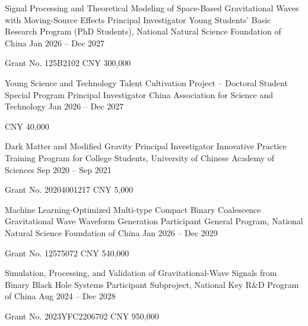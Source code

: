\begin{cventries}

  \fundingentry
    {Signal Processing and Theoretical Modeling of Space-Based Gravitational Waves with Moving-Source Effects}
    {Principal Investigator}
    {Young Students’ Basic Research Program (PhD Students), National Natural Science Foundation of China}
    {Jan 2026 -- Dec 2027}
    {
      \begin{cvitems} %
        \item{Grant No. 125B2102 \textperiodcentered{} CNY 300,000}
      \end{cvitems}
    }

  \vspace{0.1em}
  \fundingentry
    {Young Science and Technology Talent Cultivation Project -- Doctoral Student Special Program}
    {Principal Investigator}
    {China Association for Science and Technology}
    {Jan 2026 -- Dec 2027}
    {
      \begin{cvitems}
        \item{CNY 40,000}
      \end{cvitems}
    }

  \vspace{0.1em}
  \fundingentry
    {Dark Matter and Modified Gravity}
    {Principal Investigator}
    {Innovative Practice Training Program for College Students, University of Chinese Academy of Sciences}
    {Sep 2020 -- Sep 2021}
    {
      \begin{cvitems}
        \item{Grant No. 20204001217 \textperiodcentered{} CNY 5,000}
      \end{cvitems}
    }

  \fundingentry
    {Machine Learning-Optimized Multi-type Compact Binary Coalescence Gravitational Wave Waveform Generation}
    {Participant}
    {General Program, National Natural Science Foundation of China}
    {Jan 2026 -- Dec 2029}
    {
      \begin{cvitems}
        \item{Grant No. 12575072 \textperiodcentered{} CNY 540,000}
      \end{cvitems}
    }

  \vspace{0.1em}
  \fundingentry
    {Simulation, Processing, and Validation of Gravitational-Wave Signals from Binary Black Hole Systems}
    {Participant}
    {Subproject, National Key R\&D Program of China}
    {Aug 2024 -- Dec 2028}
    {
      \begin{cvitems}
        \item{Grant No. 2023YFC2206702 \textperiodcentered{} CNY 950,000}
      \end{cvitems}
    }


\end{cventries}
